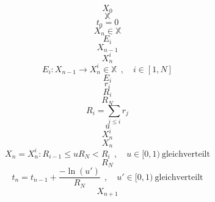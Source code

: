 \documentclass{scrreprt}
\begin{document}
\begin{equation}
X_0
\end{equation}
\begin{equation}
\mathbb{X}
\end{equation}
\begin{equation}
t_0 = 0
\end{equation}
\begin{equation}
X_n \in \mathbb{X}
\end{equation}
\begin{equation}
E_i
\end{equation}
\begin{equation}
X_{n-1}
\end{equation}
\begin{equation}
X_n^i
\end{equation}
\begin{equation}
  E_i : X_{n-1} \rightarrow X_n^i \in \mathbb{X} ~~,\quad i \in [1, N]
\end{equation}
\begin{equation}
E_i
\end{equation}
\begin{equation}
r_i
\end{equation}
\begin{equation}
R_i
\end{equation}
\begin{equation}
R_N
\end{equation}
\begin{equation}
  R_i = \sum_{j \le i}{r_j}
\end{equation}
\begin{equation}
u
\end{equation}
\begin{equation}
X_n^i
\end{equation}
\begin{equation}
X_n
\end{equation}
\begin{equation}
  X_n = X_n^i : R_{i-1} \le u R_N < R_i ~~,\quad u \in [0,1)~\text{gleichverteilt}
\end{equation}
\begin{equation}
R_N
\end{equation}
\begin{equation}
  t_n = t_{n-1} + \frac{-\ln(u')}{R_N} ~~,\quad u' \in [0,1)~\text{gleichverteilt}
\end{equation}
\begin{equation}
X_{n+1}
\end{equation}
\end{document}
